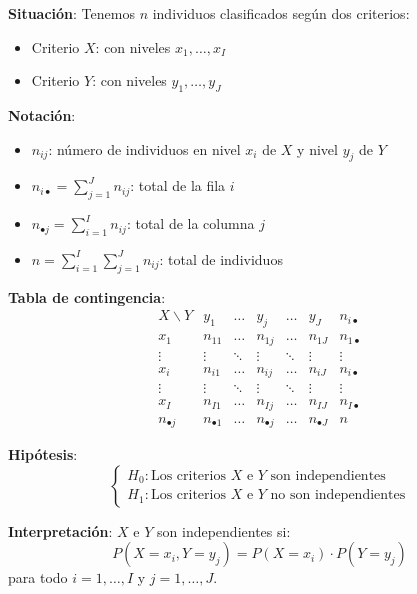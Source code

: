 \documentclass[10pt,a4paper]{article}
\begin{document}
\begin{tcolorbox}[title=Tablas de Contingencia]
    \textbf{Situación}: Tenemos $n$ individuos clasificados según dos criterios:
    \begin{itemize}
        \item Criterio $X$: con niveles $x_1, \ldots, x_I$
        \item Criterio $Y$: con niveles $y_1, \ldots, y_J$
    \end{itemize}
    
    \textbf{Notación}:
    \begin{itemize}
        \item $n_{ij}$: número de individuos en nivel $x_i$ de $X$ y nivel $y_j$ de $Y$
        \item $n_{i \bullet} = \sum_{j=1}^J n_{ij}$: total de la fila $i$
        \item $n_{\bullet j} = \sum_{i=1}^I n_{ij}$: total de la columna $j$
        \item $n = \sum_{i=1}^I \sum_{j=1}^J n_{ij}$: total de individuos
    \end{itemize}
    
    \textbf{Tabla de contingencia}:
    \[
    \begin{array}{c|ccccc|c}
    X \backslash Y & y_1 & \ldots & y_j & \ldots & y_J & n_{i \bullet} \\
    \hline
    x_1 & n_{11} & \ldots & n_{1j} & \ldots & n_{1J} & n_{1 \bullet} \\
    \vdots & \vdots & \ddots & \vdots & \ddots & \vdots & \vdots \\
    x_i & n_{i1} & \ldots & n_{ij} & \ldots & n_{iJ} & n_{i \bullet} \\
    \vdots & \vdots & \ddots & \vdots & \ddots & \vdots & \vdots \\
    x_I & n_{I1} & \ldots & n_{Ij} & \ldots & n_{IJ} & n_{I \bullet} \\
    \hline
    n_{\bullet j} & n_{\bullet 1} & \ldots & n_{\bullet j} & \ldots & n_{\bullet J} & n
    \end{array}
    \]
\end{tcolorbox}


\begin{tcolorbox}[title=Hipótesis del Contraste de Independencia]
    \textbf{Hipótesis}:
    \[
        \begin{cases}
        H_0: \text{Los criterios } X \text{ e } Y \text{ son independientes} \\
        H_1: \text{Los criterios } X \text{ e } Y \text{ no son independientes}
        \end{cases}
    \]
    
    \textbf{Interpretación}: $X$ e $Y$ son independientes si:
    \[
        P(X = x_i, Y = y_j) = P(X = x_i) \cdot P(Y = y_j)
    \]
    para todo $i = 1, \ldots, I$ y $j = 1, \ldots, J$.
\end{tcolorbox}
\end{document}
